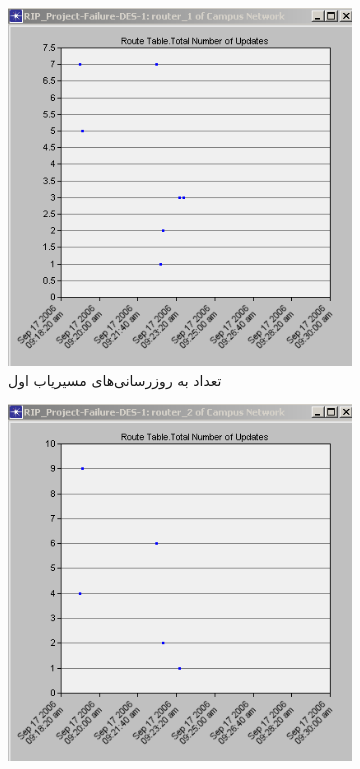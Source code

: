 \documentclass[a4paper]{article}
\begin{document}
\begin{enumerate}
    \begin{figure}[h!]
        \centering
        \begin{subfigure}{0.45\textwidth}
            \centering
            \includegraphics[width=\textwidth]{./figs/router_1_failure_update.png}
            \caption{تعداد به روزرسانی‌های مسیریاب اول}
        \end{subfigure}
        \hfill
        \begin{subfigure}{0.45\textwidth}
            \centering
            \includegraphics[width=\textwidth]{./figs/router_2_failure_update.png}

\end{subfigure}
\end{figure}
\end{enumerate}
\end{document}
